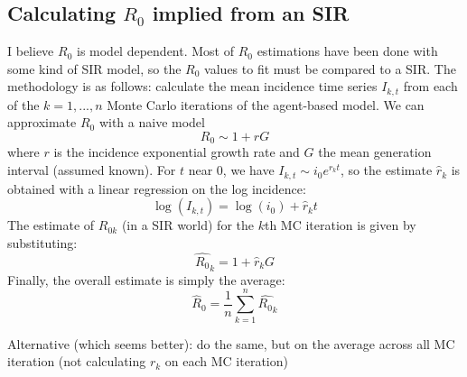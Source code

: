 \documentclass[10pt,twocolumn]{article}
\begin{document}
\subsection*{Calculating $R_0$ implied from an SIR}
I believe $R_0$ is model dependent. Most of $R_0$ estimations have been done with some kind of SIR model, so the $R_0$ values to fit must be compared to a SIR.
The methodology is as follows: calculate the mean incidence time series $I_{k,t}$ from each of the $k=1,...,n$ Monte Carlo iterations of the agent-based model. 
We can approximate $R_0$ with a naive model
$$R_0 \sim 1 + r G$$
where $r$ is the incidence exponential growth rate and $G$ the mean generation interval (assumed known). For $t$ near 0, we have  $I_{k,t}\sim i_0 e^{r_kt}$, so the estimate $\hat{r}_k$ is obtained with a linear regression on the log incidence:
$$ \log(I_{k,t}) = \log(i_0) + \hat{r}_k t$$
The estimate of $R_{0k}$ (in a SIR world) for the $k$th MC iteration is given by substituting:
$$\hat{R_0}_k = 1 + \hat{r}_k G$$
Finally, the overall estimate is simply the average:
$$\hat{R}_0 = \frac{1}{n}\sum_{k=1}^n \hat{R_0}_k$$


Alternative (which seems better): do the same, but on the average across all MC iteration (not calculating $r_k$ on each MC iteration)
\end{document}
